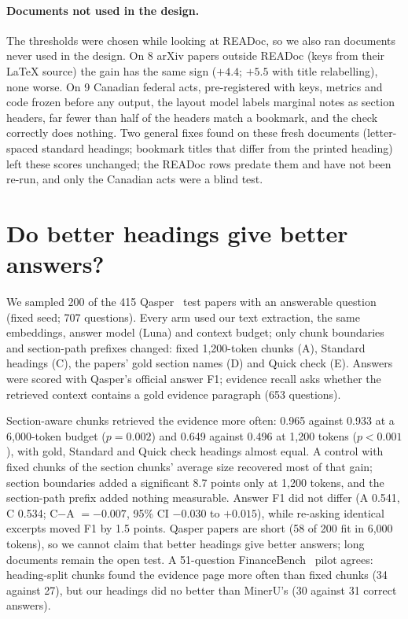 \documentclass[10pt,twocolumn,letterpaper]{article}
\begin{document}
\paragraph{Documents not used in the design.} The thresholds were chosen while looking at READoc, so we
also ran documents never used in the design. On 8 arXiv papers outside READoc (keys from their \LaTeX{}
source) the gain has the same sign ($+4.4$; $+5.5$ with title relabelling), none worse. On 9 Canadian
federal acts, pre-registered with keys, metrics and code frozen before any output, the layout model
labels marginal notes as section headers, far fewer than half of the headers match a bookmark, and
the check correctly does nothing. Two general fixes found on these fresh documents (letter-spaced
standard headings; bookmark titles that differ from the printed heading) left these scores unchanged;
the READoc rows predate them and have not been re-run, and only the Canadian acts were a blind test.

\section{Do better headings give better answers?}
\label{sec:rag}

We sampled 200 of the 415 Qasper~\cite{dasigi2021qasper} test papers with an answerable question
(fixed seed; 707 questions). Every arm used our text extraction, the same embeddings, answer model
(Luna) and context budget; only chunk boundaries and section-path prefixes changed: fixed
1,200-token chunks (A), Standard headings (C), the papers' gold section names (D) and Quick check
(E). Answers were scored with Qasper's official answer F1; evidence recall asks whether the retrieved
context contains a gold evidence paragraph (653 questions).

Section-aware chunks retrieved the evidence more often: 0.965 against 0.933 at a 6,000-token budget
($p=0.002$) and 0.649 against 0.496 at 1,200 tokens ($p<0.001$), with gold, Standard and Quick check
headings almost equal. A control with fixed chunks of the section chunks' average size recovered most
of that gain; section boundaries added a significant 8.7 points only at 1,200 tokens, and the
section-path prefix added nothing measurable. Answer F1 did not differ (A 0.541, C 0.534; C$-$A
$=-0.007$, 95\% CI $-0.030$ to $+0.015$), while re-asking identical excerpts moved F1 by 1.5 points.
Qasper papers are short (58 of 200 fit in 6,000 tokens), so we cannot claim that better headings give
better answers; long documents remain the open test. A 51-question FinanceBench~\cite{islam2023financebench}
pilot agrees: heading-split chunks found the evidence page more often than fixed chunks (34 against
27), but our headings did no better than MinerU's (30 against 31 correct answers).
\end{document}

